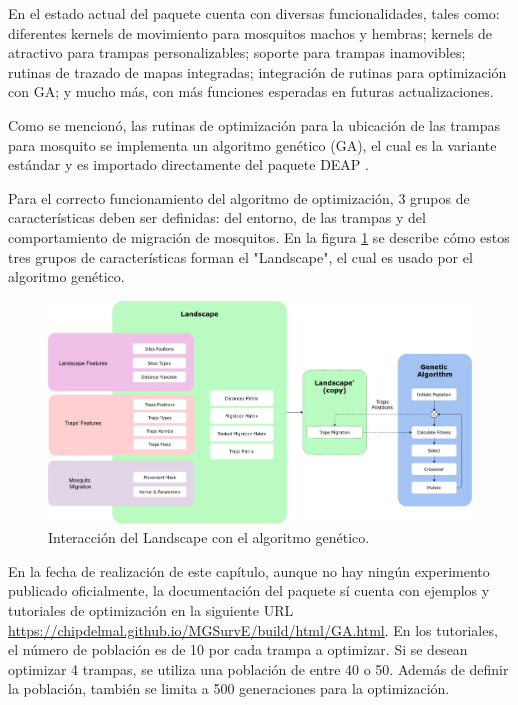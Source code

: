 \documentclass[letterpaper]{report}
\begin{document}
    En el estado actual del paquete cuenta con diversas funcionalidades, tales
    como: diferentes kernels de movimiento para mosquitos machos y hembras;
    kernels de atractivo para trampas personalizables; soporte para trampas
    inamovibles; rutinas de trazado de mapas integradas; integración de rutinas
    para optimización con GA; y mucho más, con más funciones esperadas en
    futuras actualizaciones.

    Como se mencionó, las rutinas de optimización para la ubicación de las
    trampas para mosquito se implementa un algoritmo genético (GA), el cual es
    la variante estándar y es importado directamente del paquete DEAP
    \cite{DEAP}.

    Para el correcto funcionamiento del algoritmo de optimización, 3 grupos de
    características deben ser definidas: del entorno, de las trampas y del
    comportamiento de migración de mosquitos. En la figura
    \ref{fig:mgsurve-landscape-diagram} se describe cómo estos tres grupos de
    características forman el "Landscape", el cual es usado por el algoritmo 
    genético. 

    \begin{figure}[ht!]
      \includegraphics[width=\textwidth]{fig:mgsurve-landscape-diagram.jpeg}
      \centering
      \caption{Interacción del Landscape con el algoritmo genético.}
      \label{fig:mgsurve-landscape-diagram}
      \centering
    \end{figure}

    En la fecha de realización de este capítulo, aunque no hay ningún
    experimento publicado oficialmente, la documentación del paquete sí cuenta
    con ejemplos y tutoriales de optimización en la siguiente URL
    \url{https://chipdelmal.github.io/MGSurvE/build/html/GA.html}. En los
    tutoriales, el número de población es de 10 por cada trampa a optimizar. Si
    se desean optimizar 4 trampas, se utiliza una población de entre 40 o 50.
    Además de definir la población, también se limita a 500 generaciones para
    la optimización.
\end{document}
